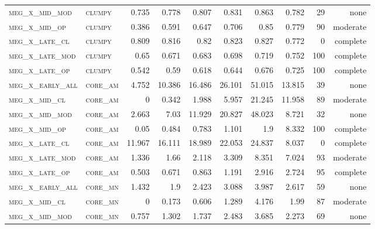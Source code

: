 \begin{landscape}
\begin{center}
\begin{footnotesize}
\begin{longtable}{llrrrrr|rrr}
\textsc{meg\_x\_mid\_mod  } & \textsc{clumpy    }    & 0.735    & 0.778    & 0.807    & 0.831    & 0.863    & 0.782    & 29  & none     \\
\textsc{meg\_x\_mid\_op   } & \textsc{clumpy    }    & 0.386    & 0.591    & 0.647    & 0.706    & 0.85     & 0.779    & 90  & moderate \\
\textsc{meg\_x\_late\_cl  } & \textsc{clumpy    }    & 0.809    & 0.816    & 0.82     & 0.823    & 0.827    & 0.772    & 0   & complete \\
\textsc{meg\_x\_late\_mod } & \textsc{clumpy    }    & 0.65     & 0.671    & 0.683    & 0.698    & 0.719    & 0.752    & 100 & complete \\
\textsc{meg\_x\_late\_op  } & \textsc{clumpy    }    & 0.542    & 0.59     & 0.618    & 0.644    & 0.676    & 0.725    & 100 & complete \\
\textsc{meg\_x\_early\_all} & \textsc{core\_am  }    & 4.752    & 10.386   & 16.486   & 26.101   & 51.015   & 13.815   & 39  & none     \\
\textsc{meg\_x\_mid\_cl   } & \textsc{core\_am  }    & 0        & 0.342    & 1.988    & 5.957    & 21.245   & 11.958   & 89  & moderate \\
\textsc{meg\_x\_mid\_mod  } & \textsc{core\_am  }    & 2.663    & 7.03     & 11.929   & 20.827   & 48.023   & 8.721    & 32  & none     \\
\textsc{meg\_x\_mid\_op   } & \textsc{core\_am  }    & 0.05     & 0.484    & 0.783    & 1.101    & 1.9      & 8.332    & 100 & complete \\
\textsc{meg\_x\_late\_cl  } & \textsc{core\_am  }    & 11.967   & 16.111   & 18.989   & 22.053   & 24.837   & 8.037    & 0   & complete \\
\textsc{meg\_x\_late\_mod } & \textsc{core\_am  }    & 1.336    & 1.66     & 2.118    & 3.309    & 8.351    & 7.024    & 93  & moderate \\
\textsc{meg\_x\_late\_op  } & \textsc{core\_am  }    & 0.503    & 0.671    & 0.863    & 1.191    & 2.916    & 2.724    & 95  & complete \\
\textsc{meg\_x\_early\_all} & \textsc{core\_mn  }    & 1.432    & 1.9      & 2.423    & 3.088    & 3.987    & 2.617    & 59  & none     \\
\textsc{meg\_x\_mid\_cl   } & \textsc{core\_mn  }    & 0        & 0.173    & 0.606    & 1.289    & 4.176    & 1.99     & 87  & moderate \\
\textsc{meg\_x\_mid\_mod  } & \textsc{core\_mn  }    & 0.757    & 1.302    & 1.737    & 2.483    & 3.685    & 2.273    & 69  & none     \\

\end{longtable}
\end{footnotesize}
\end{center}
\end{landscape}
